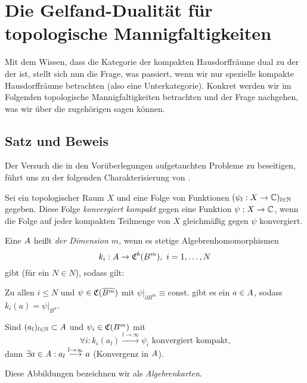 \section{Die Gelfand-Dualität für topologische Mannigfaltigkeiten}\label{sec:GD2}

Mit dem Wissen, dass die Kategorie der kompakten Hausdorffräume dual zu der der \CAlgn{} ist, stellt sich nun die Frage, was passiert, wenn wir nur spezielle kompakte Hausdorffräume betrachten (also eine Unterkategorie). Konkret werden wir im Folgenden topologische Mannigfaltigkeiten betrachten und der Frage nachgehen, was wir über die zugehörigen \CAlgn{} sagen können.



\subsection{Satz und Beweis}

Der Versuch die in den Vorüberlegungen aufgetauchten Probleme zu beseitigen, führt uns zu der folgenden Charakterisierung von \CAlgMann.

\begin{defn}\label{defn:komKonv}
Sei ein topologischer Raum $X$ und eine Folge von Funktionen $(\psi_l: X \to \mathbb{C})_{l \in \mathbb{N}}$ gegeben. Diese Folge \emph{konvergiert kompakt} gegen eine Funktion $\psi: X \to \mathbb{C}$, wenn die Folge auf jeder kompakten Teilmenge von $X$ gleichmäßig gegen $\psi$ konvergiert.
\end{defn}

\begin{defn}[\CAlgMann]\label{defn:CAM}
Eine \CAlg{} $A$ heißt \emph{\CAlgMan{} der Dimension $m$}, wenn es stetige Algebrenhomomorphismen
	\[k_i: A \to \mathfrak{C}^b(B^m), ~i = 1, \dots , N\]
gibt (für ein $N \in N$), sodass gilt:
\begin{defenum}
	\item \label{defn:CAM:surj}
	Zu allen $i \leq N$ und $\psi \in \mathfrak{C}(\overline{B^m})$ mit $\psi|_{\partial B^m} \equiv \mathrm{const.}$ gibt es ein $a \in A$, sodass $k_i(a) = \psi|_{B^n}$.
	\item \label{defn:CAM:kompkonv}
	Sind $(a_l)_{l \in \mathbb{N}} \subset A$ und $\psi_i \in \mathfrak{C}(B^m)$ mit
	\[\forall i: k_i(a_l) \overset{l \to \infty}{\longrightarrow} \psi_i \text{ konvergiert kompakt,}\]
	dann $\exists a \in A: a_l \overset{l \to \infty}{\longrightarrow} a$ (Konvergenz in $A$).
\end{defenum}
Diese Abbildungen bezeichnen wir als \emph{Algebrenkarten}.
\end{defn}

